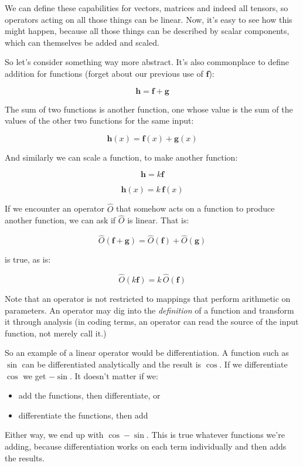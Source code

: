 We can define these capabilities for vectors, matrices and indeed all tensors, so operators acting on all those things can be linear. Now, it's easy to see how this might happen, because all those things can be described by scalar components, which can themselves be added and scaled.

So let's consider something way more abstract. It's also commonplace to define addition for functions (forget about our previous use of $\mathbf{f}$):

$$\mathbf{h} = \mathbf{f} + \mathbf{g}$$

The sum of two functions is another function, one whose value is the sum of the values of the other two functions for the same input:

$$\mathbf{h}(x) = \mathbf{f}(x) + \mathbf{g}(x)$$

And similarly we can scale a function, to make another function:

$$\mathbf{h} = k \mathbf{f}$$

$$\mathbf{h}(x) = k \,\mathbf{f}(x)$$

If we encounter an operator $\hat{O}$ that somehow acts on a function to produce another function, we can ask if $\hat{O}$ is linear. That is:

$$\hat{O}(\mathbf{f} + \mathbf{g}) = \hat{O}(\mathbf{f}) + \hat{O}(\mathbf{g})$$

is true, as is:

$$\hat{O}(k\mathbf{f}) = k\,\hat{O}(\mathbf{f})$$

Note that an operator is not restricted to mappings that perform arithmetic on parameters. An operator may dig into the \textit{definition} of a function and transform it through analysis (in coding terms, an operator can read the source of the input function, not merely call it.)

So an example of a linear operator would be differentiation. A function such as $\sin$ can be differentiated analytically and the result is $\cos$. If we differentiate $\cos$ we get $-\sin$. It doesn't matter if we:

\begin{itemize}    
    \item add the functions, then differentiate, or
    \item differentiate the functions, then add
\end{itemize}

Either way, we end up with $\cos - \sin$. This is true whatever functions we're adding, because differentiation works on each term individually and then adds the results.

